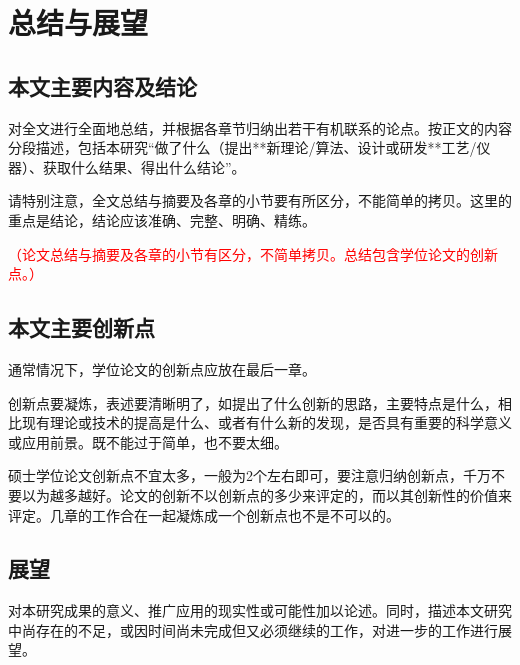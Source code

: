 
\chapter{总结与展望}
\label{cha:conclusion}

\section{本文主要内容及结论}
\label{sec:conclusion}
对全文进行全面地总结，并根据各章节归纳出若干有机联系的论点。按正文的内容分段描述，包括本研究“做了什么（提出**新理论/算法、设计或研发**工艺/仪器）、获取什么结果、得出什么结论”。

请特别注意，全文总结与摘要及各章的小节要有所区分，不能简单的拷贝。这里的重点是结论，结论应该准确、完整、明确、精练。

\textcolor{red}{（论文总结与摘要及各章的小节有区分，不简单拷贝。总结包含学位论文的创新点。）}


\section{本文主要创新点}
\label{sec:conclusion}
通常情况下，学位论文的创新点应放在最后一章。

创新点要凝炼，表述要清晰明了，如提出了什么创新的思路，主要特点是什么，相比现有理论或技术的提高是什么、或者有什么新的发现，是否具有重要的科学意义或应用前景。既不能过于简单，也不要太细。

硕士学位论文创新点不宜太多，一般为2个左右即可，要注意归纳创新点，千万不要以为越多越好。论文的创新不以创新点的多少来评定的，而以其创新性的价值来评定。几章的工作合在一起凝炼成一个创新点也不是不可以的。


\section{展望}
\label{sec:conclusion}
对本研究成果的意义、推广应用的现实性或可能性加以论述。同时，描述本文研究中尚存在的不足，或因时间尚未完成但又必须继续的工作，对进一步的工作进行展望。